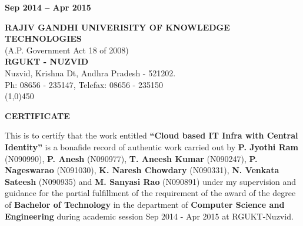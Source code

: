 \documentclass[12pt]{report}
\begin{document}
\begin{titlepage}
\begin{center}
\normalsize
\vfill
%
%

\textbf{Sep 2014 -- Apr 2015 }

\end{center}
\end{titlepage}


  
\thispagestyle{empty}


\begin{center}
  \textbf{RAJIV GANDHI UNIVERISITY OF KNOWLEDGE TECHNOLOGIES}  \\
 	(A.P. Government Act 18 of 2008) \\
 	\textbf{RGUKT - NUZVID} \\
 	Nuzvid, Krishna Dt, Andhra Pradesh - 521202. \\
 	Ph: 08656 - 235147, Telefax: 08656 - 235150 \\
 	\line(1,0){450}
\end{center}


\begin{center}

\Large
\textbf{CERTIFICATE} \\
\end{center}
\normalsize
 This is to certify that the work entitled \textbf{``Cloud based IT Infra with Central Identity''} is a bonafide record of authentic work carried out by \textbf{P. Jyothi Ram} (N090990), \textbf{P. Anesh} (N090977), \textbf{T. Aneesh Kumar} (N090247), \textbf{P. Nageswarao} (N091030), \textbf{K. Naresh Chowdary} (N090331), \textbf{N. Venkata Sateesh} (N090935) and  \textbf{M. Sanyasi Rao} (N090891)  under my supervision and guidance for the partial fulfillment of the requirement of the award of the degree of \textbf{Bachelor of Technology} in the department of \textbf{Computer Science and Engineering} during academic session Sep 2014 - Apr 2015 at RGUKT-Nuzvid. \newline
\end{document}
